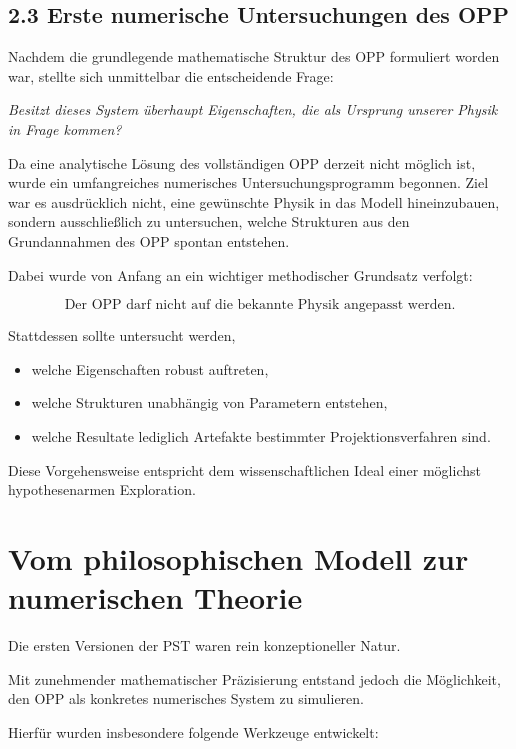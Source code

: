 \subsection{2.3 Erste numerische Untersuchungen des OPP}

Nachdem die grundlegende mathematische Struktur des OPP formuliert worden war, stellte sich unmittelbar die entscheidende Frage:

\begin{center}
\emph{Besitzt dieses System überhaupt Eigenschaften, die als Ursprung unserer Physik in Frage kommen?}
\end{center}

Da eine analytische Lösung des vollständigen OPP derzeit nicht möglich ist, wurde ein umfangreiches numerisches Untersuchungsprogramm begonnen. Ziel war es ausdrücklich nicht, eine gewünschte Physik in das Modell hineinzubauen, sondern ausschließlich zu untersuchen, welche Strukturen aus den Grundannahmen des OPP spontan entstehen.

Dabei wurde von Anfang an ein wichtiger methodischer Grundsatz verfolgt:

\[
\boxed{
\text{Der OPP darf nicht auf die bekannte Physik angepasst werden.}
}
\]

Stattdessen sollte untersucht werden,

\begin{itemize}
\item welche Eigenschaften robust auftreten,
\item welche Strukturen unabhängig von Parametern entstehen,
\item welche Resultate lediglich Artefakte bestimmter Projektionsverfahren sind.
\end{itemize}

Diese Vorgehensweise entspricht dem wissenschaftlichen Ideal einer möglichst hypothesenarmen Exploration.

\section*{Vom philosophischen Modell zur numerischen Theorie}

Die ersten Versionen der PST waren rein konzeptioneller Natur.

Mit zunehmender mathematischer Präzisierung entstand jedoch die Möglichkeit, den OPP als konkretes numerisches System zu simulieren.

Hierfür wurden insbesondere folgende Werkzeuge entwickelt:

